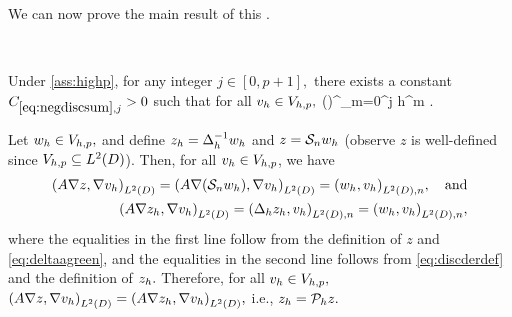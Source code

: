 
We can now prove the main result of this .

\label{lem:negdiscsum}

\

\noindent Under \cref{ass:highp}, for any integer $j \in [0,p+1],$ there exists a constant $\Csumj > 0$ such that for all $v_{h} \in V_{h,p},$
\beq\label{eq:negdiscsum}
 \leq \Csumj\mleft(\En\nvar\mright)^{}\nmax \sum_{m=0}^j h^{m} .
\eeq
\ele

Let $w_{h} \in V_{h,p},$ and define $z_{h} = \Delta_{h}^{-1} w_{h}$ and $z = \mathcal S_{n} w_{h}$ (observe $z$ is well-defined since $\Vhp \subseteq \LtD$). Then, for all $v_{h} \in V_{h,p}$, we have
\begin{align*}
\IPLtD{A \grad z}{\grad \vh} = \IPLtD{A \grad \mleft(\sdsol \wh\mright)}{\grad \vh} = \IPLtDn{\wh}{\vh},\quad \text{and}\\
\IPLtD{A \grad \zh}{\grad \vh} = \IPLtDn{\Deltah \zh}{\vh} = \IPLtDn{\wh}{\vh},
\end{align*}
where the equalities in the first line follow from the definition of $z$ and \cref{eq:deltaagreen}, and the equalities in the second line follows from \cref{eq:discderdef} and the definition of $z_{h}.$  Therefore, for all $v_{h} \in V_{h,p},$ $\IPLtD{A\grad z}{\grad \vh} = \IPLtD{A\grad \zh}{\grad \vh},$ i.e., $z_{h} = \mathcal P_{h} z.$

